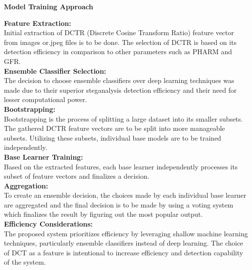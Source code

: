 \begin{flushleft}
    \Large{\textbf{Model Training Approach}}\\
\end{flushleft}
\textbf{Feature Extraction:}\\
Initial extraction of DCTR (Discrete Cosine Transform Ratio) feature vector from images or.jpeg files is to be done. The selection of DCTR is based on its detection efficiency in comparison to other parameters such as PHARM and GFR.\vspace{0.25cm}\\
\textbf{Ensemble Classifier Selection:}\\
The decision to choose ensemble classifiers over deep learning techniques was made due to their superior steganalysis detection efficiency and their need for lesser computational power.\vspace{0.25cm}\\
\textbf{Bootstrapping:}\\
Bootstrapping is the process of splitting a large dataset into its smaller subsets. The gathered DCTR feature vectors are to be split  into more manageable subsets. Utilizing these subsets, individual base models are to be trained independently.\vspace{0.25cm}\\
\textbf{Base Learner Training:}\\
Based on the extracted features, each base learner independently processes its subset of feature vectors and finalizes a decision.\vspace{0.25cm}\\
\textbf{Aggregation:}\\
To create an ensemble decision, the choices made by each individual base learner are aggregated and the final decision is to be made by using a voting system which finalizes the result by figuring out the most popular output.\vspace{0.25cm}\\
\textbf{Efficiency Considerations:}\\
The proposed system prioritizes efficiency by leveraging shallow machine learning techniques, particularly ensemble classifiers instead of deep learning. The choice of DCT as a feature is intentional to increase efficiency and detection capability of the system.\\
\clearpage 


